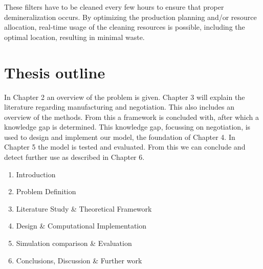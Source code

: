 These filters have to be cleaned every few hours to ensure that proper demineralization occurs. By optimizing the production planning and/or resource allocation, real-time usage of the cleaning resources is possible, including the optimal location, resulting in minimal waste.

\section{Thesis outline}
In Chapter 2 an overview of the problem is given. Chapter 3 will explain the literature regarding manufacturing and negotiation. This also includes an overview of the methods. From this a framework is concluded with, after which a knowledge gap is determined. This knowledge gap, focussing on negotiation, is used to design and implement our model, the foundation of Chapter 4. In Chapter 5 the model is tested and evaluated. From this we can conclude and detect further use as described in Chapter 6.
\begin{enumerate}
	
	\item
	Introduction 
	\item
	Problem Definition 
	\item
	Literature Study \& Theoretical Framework
	\item
	Design \& Computational Implementation
	\item
	Simulation comparison \& Evaluation
	\item
	Conclusions, Discussion \& Further work
\end{enumerate}

%
%
%
%